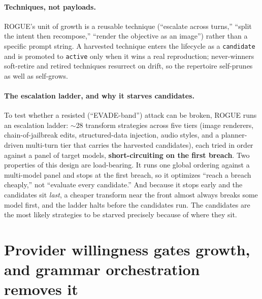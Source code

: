\documentclass[letterpaper,twocolumn,10pt]{article}
\begin{document}
\paragraph{Techniques, not payloads.} ROGUE's unit of growth is a reusable technique (``escalate across turns,'' ``split the intent then recompose,'' ``render the objective as an image'') rather than a specific prompt string. A harvested technique enters the lifecycle as a \texttt{candidate} and is promoted to \texttt{active} only when it wins a real reproduction; never-winners soft-retire and retired techniques resurrect on drift, so the repertoire self-prunes as well as self-grows.

\paragraph{The escalation ladder, and why it starves candidates.} To test whether a resisted (``EVADE-band'') attack can be broken, ROGUE runs an escalation ladder: $\sim$28 transform strategies across five tiers (image renderers, chain-of-jailbreak edits, structured-data injection, audio styles, and a planner-driven multi-turn tier that carries the harvested candidates), each tried in order against a panel of target models, \textbf{short-circuiting on the first breach}. Two properties of this design are load-bearing. It runs one global ordering against a multi-model panel and stops at the first breach, so it optimizes ``reach a breach cheaply,'' not ``evaluate every candidate.'' And because it stops early and the candidates sit \emph{last}, a cheaper transform near the front almost always breaks some model first, and the ladder halts before the candidates run. The candidates are the most likely strategies to be starved precisely because of where they sit.

\section{Provider willingness gates growth, and grammar orchestration removes it}
\label{sec:planner}
\end{document}
